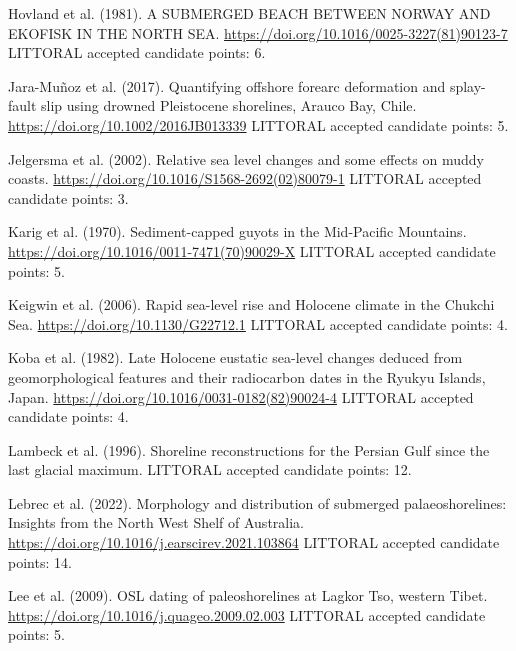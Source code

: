 \documentclass[twocolumn,10pt]{article}
\begin{document}
\begin{thebibliography}{}
Hovland et al. (1981).
\newblock A SUBMERGED BEACH BETWEEN NORWAY AND EKOFISK IN THE NORTH SEA.
\newblock \url{https://doi.org/10.1016/0025-3227(81)90123-7}
\newblock LITTORAL accepted candidate points: 6.

Jara-Muñoz et al. (2017).
\newblock Quantifying offshore forearc deformation and splay-fault slip using drowned Pleistocene shorelines, Arauco Bay, Chile.
\newblock \url{https://doi.org/10.1002/2016JB013339}
\newblock LITTORAL accepted candidate points: 5.

Jelgersma et al. (2002).
\newblock Relative sea level changes and some effects on muddy coasts.
\newblock \url{https://doi.org/10.1016/S1568-2692(02)80079-1}
\newblock LITTORAL accepted candidate points: 3.

Karig et al. (1970).
\newblock Sediment-capped guyots in the Mid-Pacific Mountains\*.
\newblock \url{https://doi.org/10.1016/0011-7471(70)90029-X}
\newblock LITTORAL accepted candidate points: 5.

Keigwin et al. (2006).
\newblock Rapid sea-level rise and Holocene climate in the Chukchi Sea.
\newblock \url{https://doi.org/10.1130/G22712.1}
\newblock LITTORAL accepted candidate points: 4.

Koba et al. (1982).
\newblock Late Holocene eustatic sea-level changes deduced from geomorphological features and their radiocarbon dates in the Ryukyu Islands, Japan.
\newblock \url{https://doi.org/10.1016/0031-0182(82)90024-4}
\newblock LITTORAL accepted candidate points: 4.

Lambeck et al. (1996).
\newblock Shoreline reconstructions for the Persian Gulf since the last glacial maximum.
\newblock LITTORAL accepted candidate points: 12.

Lebrec et al. (2022).
\newblock Morphology and distribution of submerged palaeoshorelines: Insights from the North West Shelf of Australia.
\newblock \url{https://doi.org/10.1016/j.earscirev.2021.103864}
\newblock LITTORAL accepted candidate points: 14.

Lee et al. (2009).
\newblock OSL dating of paleoshorelines at Lagkor Tso, western Tibet.
\newblock \url{https://doi.org/10.1016/j.quageo.2009.02.003}
\newblock LITTORAL accepted candidate points: 5.


\end{thebibliography}
\end{document}
